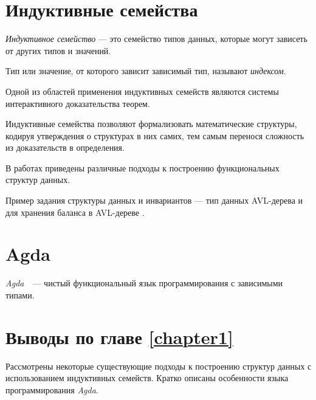 \section{Индуктивные семейства}

\begin{definition}
\emph{Индуктивное семейство} \cite{DybjerIndFam}— это семейство типов данных,
которые могут зависеть от других типов и значений.

Тип или значение, от которого зависит зависимый тип, называют \emph{индексом}.
\end{definition}

Одной из областей применения индуктивных семейств являются системы интерактивного
доказательства теорем.

Индуктивные семейства позволяют формализовать математические структуры,
кодируя утверждения о структурах в них самих, тем самым перенося сложность из
доказательств в определения.

В работах \cite{OkasakiThesis, McBridePivotal} приведены различные подходы
к построению функциональных структур данных.

Пример задания структуры данных и инвариантов —
тип данных AVL-дерева и для хранения баланса в AVL-дереве \cite{AVLTree}.
\newline


\section{Agda}
\textit{Agda}~\cite{AgdaLang}~---  чистый функциональный язык программирования с зависимыми типами.


\section{Выводы по главе \ref{chapter1}}
Рассмотрены некоторые существующие подходы к построению структур данных
с использованием индуктивных семейств.
Кратко описаны особенности языка программирования \textit{Agda}.
